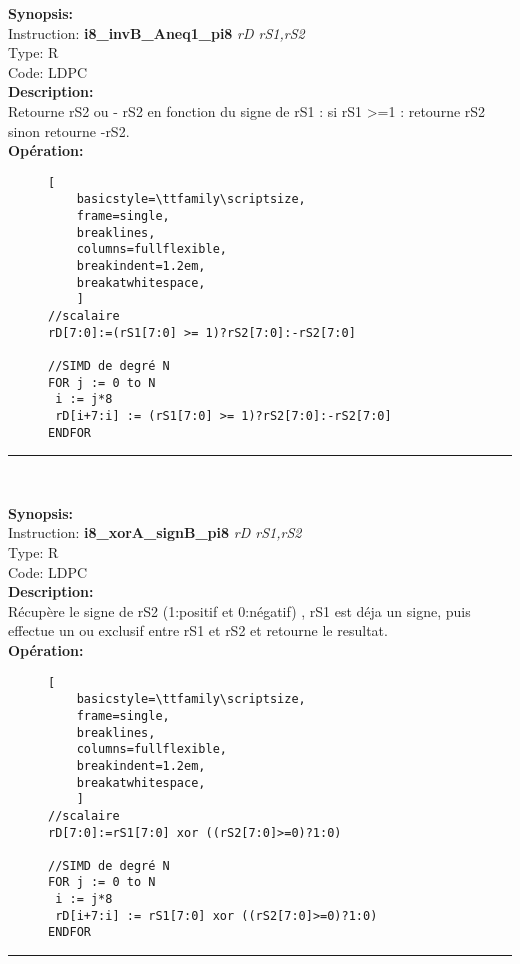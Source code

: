 {\scriptsize
\textbf{Synopsis:}\\
Instruction: \textbf{i8\_invB\_Aneq1\_pi8 } \textit{rD rS1,rS2}\\
Type: R\\
Code: LDPC\\
\textbf{Description:}\\
Retourne rS2 ou - rS2 en fonction du signe de rS1 : si rS1 >=1 : retourne rS2 sinon retourne -rS2.\\
\textbf{Opération:}\\
    \begin{figure}[H]
    \begin{lstlisting}[
    basicstyle=\ttfamily\scriptsize,
    frame=single,
    breaklines,
    columns=fullflexible,
    breakindent=1.2em,
    breakatwhitespace,
    ]
//scalaire
rD[7:0]:=(rS1[7:0] >= 1)?rS2[7:0]:-rS2[7:0]
    
//SIMD de degré N
FOR j := 0 to N 
 i := j*8    
 rD[i+7:i] := (rS1[7:0] >= 1)?rS2[7:0]:-rS2[7:0]
ENDFOR
\end{lstlisting}
\end{figure}
}
\rule{8cm}{0.4pt}\\
{\scriptsize
\textbf{Synopsis:}\\
Instruction: \textbf{i8\_xorA\_signB\_pi8 } \textit{rD rS1,rS2}\\
Type: R\\
Code: LDPC\\
\textbf{Description:}\\
Récupère le signe de rS2 (1:positif et 0:négatif) , rS1 est déja un signe, puis effectue un ou exclusif entre rS1 et rS2 et retourne le resultat.\\
\textbf{Opération:}\\
    \begin{figure}[H]
    \begin{lstlisting}[
    basicstyle=\ttfamily\scriptsize,
    frame=single,
    breaklines,
    columns=fullflexible,
    breakindent=1.2em,
    breakatwhitespace,
    ]
//scalaire
rD[7:0]:=rS1[7:0] xor ((rS2[7:0]>=0)?1:0)
    
//SIMD de degré N
FOR j := 0 to N    
 i := j*8    
 rD[i+7:i] := rS1[7:0] xor ((rS2[7:0]>=0)?1:0)
ENDFOR
\end{lstlisting}
\end{figure}
}
\rule{8cm}{0.4pt}\\
